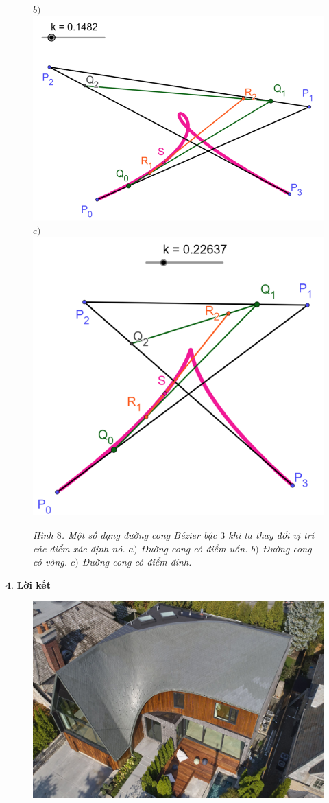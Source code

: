 \begin{multicols}{2}
\begin{figure}[H]
		$b)$\includegraphics[width= 0.83\linewidth]{13}
		$c)$\includegraphics[width= 0.83\linewidth]{14}
		\caption{\small\textit{\color{toanhocdoisong}Hình $8$. Một số dạng đường cong Bézier bậc $3$ khi ta thay đổi vị trí các điểm xác định nó. $a)$ Đường cong có điểm uốn. $b)$ Đường cong có vòng. $c)$ Đường cong có điểm đỉnh.}}
		\vspace*{-5pt}
	\end{figure}
	$\pmb4.$ \textbf{\color{toanhocdoisong}Lời kết}
	\begin{figure}[H]
		\vspace*{-5pt}
		\centering
		\captionsetup{labelformat= empty, justification=centering}
		\includegraphics[width= 1\linewidth]{15}

\end{figure}
\end{multicols}
